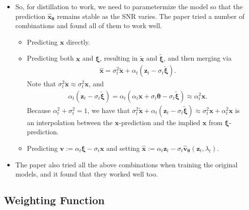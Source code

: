 \documentclass[10pt]{article}
\newcommand{\ve}[1]{\mathbf{#1}}
\newcommand{\ves}[1]{\boldsymbol{#1}}
\begin{document}
\begin{itemize}
  \item So, for distillation to work, we need to parametermize the model so that the prediction $\hat{\ve{x}}_{\ves{\theta}}$ remains stable as the SNR varies. The paper tried a number of combinations and found all of them to work well.
  \begin{itemize}
    \item Predicting $\ve{x}$ directly.
    \item Predicting both $\ve{x}$ and $\ves{\xi}$, resulting in $\tilde{\ve{x}}$ and $\tilde{\ves{\xi}}$, and then merging via
    \begin{align*}
      \hat{\ve{x}} = \sigma_t^2 \tilde{\ve{x}} + \alpha_t(\ve{z}_t - \sigma_t \tilde{\ves{\xi}}).
    \end{align*}
    Note that $\sigma_t^2 \tilde{\ve{x}} \approx \sigma_t^2 \ve{x}$, and
    \begin{align*}
      \alpha_t (\ve{z}_t - \sigma_t \tilde{\ves{\xi}}) 
      = \alpha_t (\alpha_t \ve{x} + \sigma_t \ves{\theta} - \sigma_t \tilde{\ves{\xi}}) \approx \alpha_t^2 \ve{x}.
    \end{align*}
    Because $\alpha_t^2 + \sigma_t^2 = 1$, we have that $\sigma_t^2 \tilde{\ve{x}} + \alpha_t(\ve{z}_t - \sigma_t \tilde{\ves{\xi}}) \approx \sigma_t^2 \ve{x} + \alpha_t^2\ve{x}$ is an interpolation between the $\ve{x}$-prediction and the implied $\ve{x}$ from $\ves{\xi}$-prediction.
    \item Predicting $\ve{v} := \alpha_t \ves{\xi} - \sigma_t\ve{x}$ and setting $\hat{\ve{x}} := \alpha_t \ve{z}_t - \sigma_t \hat{\ve{v}}_{\ves{\theta}}(\ve{z}_t, \lambda_t)$.
  \end{itemize}

  \item The paper also tried all the above combinations when training the original models, and it found that they worked well too.
\end{itemize}

\subsection{Weighting Function}
\end{document}
